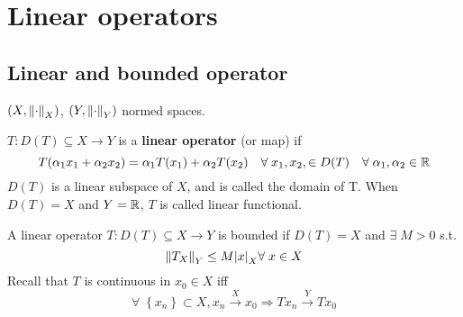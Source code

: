 \newpage
\section{Linear operators}
\subsection{Linear and bounded operator}
\((X, \norm{\cdot}_X)\), \((Y, \norm{\cdot}_Y)\) normed spaces.
\begin{definition}
    \(T : D(T) \subseteq X \to Y\) is a \textbf{linear operator} (or map) if 
    \[
        T(\alpha_1 x_1 + \alpha_2 x_2) = \alpha_1 T(x_1) + \alpha_2 T(x_2) \quad \forall \; x_1, x_2, \in D(T) \quad \forall \; \alpha_1, \alpha_2 \in \mathbb{R}
    \]
    \(D(T)\) is a linear subspace of \(X\), and is called the domain of T. When \(D(T) = X\) and \(Y = \mathbb{R}\), \(T\) is called linear functional.
\end{definition}
\begin{definition}
    A linear operator \(T : D(T) \subseteq X \to Y\) is bounded if \(D(T) = X\) and \(\exists \; M >0\) s.t. 
    \[
        \norm{T_X}_Y \leq M \abs{x}_X \forall \; x \in X
    \]
    Recall that \(T\) is continuous in \(x_0 \in X\) iff 
    \[
        \forall \; \left\{ x_n \right\} \subset X, x_n \overset{X}{\to} x_0 \Rightarrow Tx_n \overset{Y}{\to} Tx_0
    \]
\end{definition}
